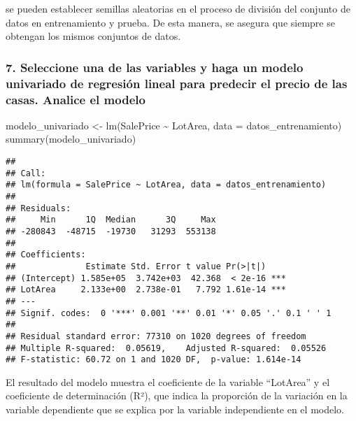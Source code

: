 \documentclass[
]{article}
\newenvironment{Shaded}{\begin{snugshade}}{\end{snugshade}}
\newcommand{\AttributeTok}[1]{\textcolor[rgb]{0.77,0.63,0.00}{#1}}
\newcommand{\FunctionTok}[1]{\textcolor[rgb]{0.00,0.00,0.00}{#1}}
\newcommand{\NormalTok}[1]{#1}
\newcommand{\OtherTok}[1]{\textcolor[rgb]{0.56,0.35,0.01}{#1}}
\newcommand{\SpecialCharTok}[1]{\textcolor[rgb]{0.00,0.00,0.00}{#1}}
\begin{document}
se pueden establecer semillas aleatorias en el proceso de división del
conjunto de datos en entrenamiento y prueba. De esta manera, se asegura
que siempre se obtengan los mismos conjuntos de datos.

\hypertarget{seleccione-una-de-las-variables-y-haga-un-modelo-univariado-de-regresiuxf3n-lineal-para-predecir-el-precio-de-las-casas.-analice-el-modelo}{%
\subsubsection{7. Seleccione una de las variables y haga un modelo
univariado de regresión lineal para predecir el precio de las casas.
Analice el
modelo}\label{seleccione-una-de-las-variables-y-haga-un-modelo-univariado-de-regresiuxf3n-lineal-para-predecir-el-precio-de-las-casas.-analice-el-modelo}}

\begin{Shaded}
\begin{Highlighting}[]
\NormalTok{modelo\_univariado }\OtherTok{\textless{}{-}} \FunctionTok{lm}\NormalTok{(SalePrice }\SpecialCharTok{\textasciitilde{}}\NormalTok{ LotArea, }\AttributeTok{data =}\NormalTok{ datos\_entrenamiento)}
\FunctionTok{summary}\NormalTok{(modelo\_univariado)}
\end{Highlighting}
\end{Shaded}

\begin{verbatim}
## 
## Call:
## lm(formula = SalePrice ~ LotArea, data = datos_entrenamiento)
## 
## Residuals:
##     Min      1Q  Median      3Q     Max 
## -280843  -48715  -19730   31293  553138 
## 
## Coefficients:
##              Estimate Std. Error t value Pr(>|t|)    
## (Intercept) 1.585e+05  3.742e+03  42.368  < 2e-16 ***
## LotArea     2.133e+00  2.738e-01   7.792 1.61e-14 ***
## ---
## Signif. codes:  0 '***' 0.001 '**' 0.01 '*' 0.05 '.' 0.1 ' ' 1
## 
## Residual standard error: 77310 on 1020 degrees of freedom
## Multiple R-squared:  0.05619,    Adjusted R-squared:  0.05526 
## F-statistic: 60.72 on 1 and 1020 DF,  p-value: 1.614e-14
\end{verbatim}

El resultado del modelo muestra el coeficiente de la variable
``LotArea'' y el coeficiente de determinación (R²), que indica la
proporción de la variación en la variable dependiente que se explica por
la variable independiente en el modelo.

\begin{Shaded}
\end{Shaded}
\end{document}

